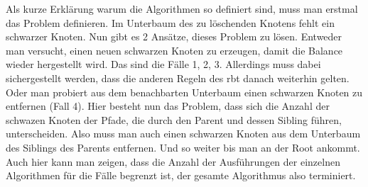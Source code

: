 \documentclass[11pt]{article}
\begin{document}
Als kurze Erklärung warum die Algorithmen so definiert sind, muss man erstmal das Problem definieren. Im Unterbaum des zu löschenden Knotens fehlt ein schwarzer Knoten. Nun gibt es 2 Ansätze, dieses Problem zu lösen. Entweder man versucht, 
einen neuen schwarzen Knoten zu erzeugen, damit die Balance wieder hergestellt wird. Das sind die Fälle 1, 2, 3. Allerdings muss dabei sichergestellt werden, dass die anderen Regeln des \gls{rbt} danach weiterhin gelten. Oder man probiert aus dem benachbarten Unterbaum einen schwarzen Knoten zu entfernen (Fall 4).
Hier besteht nun das Problem, dass sich die Anzahl der schwazen Knoten der Pfade, die durch den Parent und dessen Sibling führen, unterscheiden. Also muss man auch einen schwarzen Knoten aus dem Unterbaum des Siblings des Parents entfernen. Und so weiter bis man an der Root ankommt.  
Auch hier kann man zeigen, dass die Anzahl der Ausführungen der einzelnen Algorithmen für die Fälle begrenzt ist, der gesamte Algorithmus also terminiert.
\end{document}
